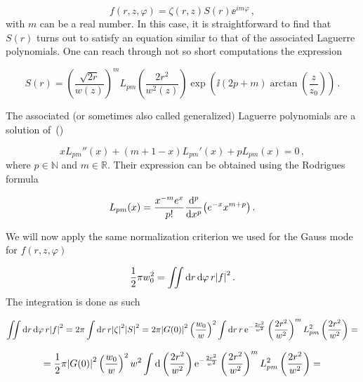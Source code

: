 \documentclass[12pt, class=report, crop=false]{standalone}
\begin{document}
\begin{equation}
  f(r,z,\varphi) = \zeta (r,z) S(r) \ee^{im\varphi}\,,
\end{equation}
with \(m\) can be a real number. In this case, it is straightforward to find that \(S(r)\) turns out to satisfy an equation similar to that of the associated Laguerre polynomials. One can reach through not so short computations the expression

\begin{equation}
  S(r) = \left(\frac{\sqrt{2r}}{w(z)}\right)^m L_{pm}\left(\frac{2r^2}{w^2(z)}\right) \exp(\ii (2p+m) \arctan(\frac{z}{z_0}))\,.
\end{equation}

The associated (or sometimes also called generalized) Laguerre polynomials are a solution of~(\cite{abramowitzHandbookMathematicalFunctions2013})

\begin{equation}
  x L_{pm}''(x) + (m+1-x) L_{pm}'(x) + p L_{pm}(x) =0\,,
\end{equation}
where \(p\in\mathbb{N}\) and \(m\in\mathbb{R}\).
Their expression can be obtained using the Rodrigues formula

\begin{equation}
  L_{pm} (x) = \frac{x^{-m} e^x}{p!} \dv[p]{x} (e^{-x} x^{m+p})\,.
\end{equation}

We will now apply the same normalization criterion we used for the Gauss mode for \(f(r,z,\varphi)\)

\begin{equation}
  \frac{1}{2}\pi w_0^2 = \iint \dd{r}\dd{\varphi} r \abs{f}^2\,.
\end{equation}
The integration is done as such

\begin{equation*}
  \iint \dd{r}\dd{\varphi} r \abs{f}^2 = 2 \pi \int \dd{r} r \abs{\zeta}^2 \abs{S}^2 =2 \pi \abs{G(0)}^2 \left(\frac{w_0}{w}\right)^2 \int \dd{r} r \operatorname{e}^{-\frac{2r^2}{w^2}} \left(\frac{2r^2}{w^2}\right)^m L_{pm}^2\left(\frac{2r^2}{w^2}\right) =
\end{equation*}

\begin{equation*}
  = \frac{1}{2} \pi \abs{G(0)}^2 \left(\frac{w_0}{w}\right)^2 w^2 \int \dd{\left(\frac{2r^2}{w^2}\right)}  \operatorname{e}^{-\frac{2r^2}{w^2}} \left(\frac{2r^2}{w^2}\right)^m L_{pm}^2\left(\frac{2r^2}{w^2}\right) =
\end{equation*}
\end{document}
